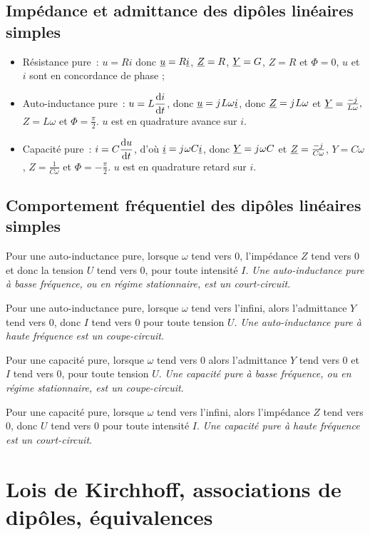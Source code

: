 \subsection{Impédance et admittance des dipôles linéaires simples}
\begin{itemize}
  \item Résistance pure~: \(u=Ri\) donc \(\underline{u} = R \underline{i}\), \(\underline{Z} =R\), 
    \(\underline{Y} = G\), \(Z=R\) et \(\Phi=0\), \(u\) et \(i\) sont en 
    concordance de phase ;
  \item Auto-inductance pure~: \(u=L\dfrac{\mathrm{d} i}{\mathrm{d} t}\), donc \(\underline{u} = 
    {j\mkern1mu} L \omega \underline{i}\), donc \(\underline{Z} = {j\mkern1mu} L\omega\) et \(\underline{Y} = 
    \frac{-{j\mkern1mu}}{L\omega},\) \(Z=L\omega\) et 
    \(\Phi=\frac{\pi}{2}\). \(u\) est en quadrature avance sur 
    \(i\).
  \item Capacité pure~: \(i=C\dfrac{\mathrm{d} u}{\mathrm{d} t}\), d'où \(\underline{i} = {j\mkern1mu}\omega 
    C \underline{i}\), donc \(\underline{Y} = {j\mkern1mu}\omega C\) et \(\underline{Z} = 
    \frac{-{j\mkern1mu}}{C\omega}\), \(Y=C\omega\), \(Z=\frac{1}{C\omega}\) 
    et \(\Phi = -\frac{\pi}{2}\). \(u\) est en quadrature retard 
    sur \(i\).
\end{itemize}
\subsection{Comportement fréquentiel des dipôles linéaires simples}
Pour une auto-inductance pure, lorsque \(\omega\) tend vers 0, 
l'impédance \(Z\) tend vers 0 et donc la tension \(U\) tend vers 0, 
pour toute intensité \(I\). \emph{Une auto-inductance pure à basse 
fréquence, ou en régime stationnaire, est un court-circuit}.

Pour une auto-inductance pure, lorsque \(\omega\) tend vers l'infini, 
alors l'admittance \(Y\) tend vers 0, donc \(I\) tend vers 0 pour toute 
tension \(U\). \emph{Une auto-inductance pure à haute fréquence est un 
coupe-circuit}.

Pour une capacité pure, lorsque \(\omega\) tend vers 0 alors 
l'admittance \(Y\) tend vers 0 et \(I\) tend vers 0, pour toute tension 
\(U\). \emph{Une capacité pure à basse fréquence, ou en régime 
stationnaire, est un coupe-circuit}.

Pour une capacité pure, lorsque \(\omega\) tend vers l'infini, alors 
l'impédance \(Z\) tend vers 0, donc \(U\) tend vers 0 pour toute 
intensité \(I\). \emph{Une capacité pure à haute fréquence est un 
court-circuit}.
\section{Lois de Kirchhoff, associations de dipôles, équivalences}%
